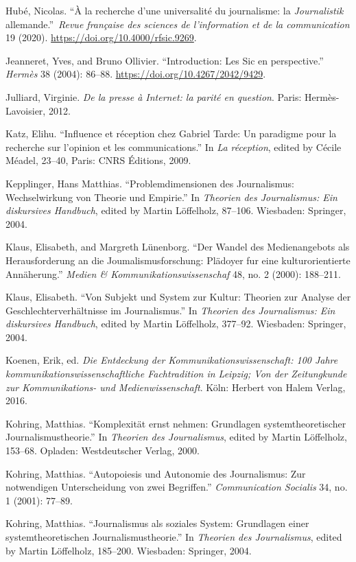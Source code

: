 \documentclass{tufte-handout}
\begin{document}
\begin{hangparas}{.25in}{1}
Hubé, Nicolas. ``À la recherche d'une universalité du journalisme: la
\emph{Journalistik} allemande.''~\emph{Revue française des sciences de
l'information et de la communication} 19 (2020).
\url{https://doi.org/10.4000/rfsic.9269}.

Jeanneret, Yves, and Bruno Ollivier. ``Introduction: Les Sic en
perspective.'' \emph{Hermès} 38 (2004): 86--88.
\url{https://doi.org/10.4267/2042/9429}.

Julliard, Virginie. \emph{De la presse à Internet: la parité en
question}. Paris: Hermès-Lavoisier, 2012.

Katz, Elihu. ``Influence et réception chez Gabriel Tarde: Un paradigme
pour la recherche sur l'opinion et les communications.'' In \emph{La
réception}, edited by Cécile Méadel, 23--40, Paris: CNRS Éditions, 2009.

Kepplinger, Hans Matthias. ``Problemdimensionen des Journalismus:
Wechselwirkung von Theorie und Empirie.'' In \emph{Theorien des
Journalismus: Ein diskursives Handbuch}, edited by Martin Löffelholz,
87--106. Wiesbaden: Springer, 2004.

Klaus, Elisabeth, and Margreth Lünenborg. ``Der Wandel des
Medienangebots als Herausforderung an die Joumalismusforschung: Plädoyer
fur eine kulturorientierte Annäherung.'' \emph{Medien \&
Kommunikationswissenschaf} 48, no. 2 (2000): 188--211.

Klaus, Elisabeth. ``Von Subjekt und System zur Kultur: Theorien zur
Analyse der Geschlechterverhältnisse im Journalismus.'' In
\emph{Theorien des Journalismus: Ein diskursives Handbuch}, edited by
Martin Löffelholz, 377--92. Wiesbaden: Springer, 2004.

Koenen, Erik, ed. \emph{Die Entdeckung der Kommunikationswissenschaft:
100 Jahre kommunikationswissenschaftliche Fachtradition in Leipzig; Von
der Zeitungkunde zur Kommunikations- und Medienwissenschaft}. Köln:
Herbert von Halem Verlag, 2016.

Kohring, Matthias. ``Komplexität ernst nehmen: Grundlagen
systemtheoretischer Journalismustheorie.'' In \emph{Theorien des
Journalismus}, edited by Martin Löffelholz, 153--68. Opladen:
Westdeutscher Verlag, 2000.

Kohring, Matthias. ``Autopoiesis und Autonomie des Journalismus: Zur
notwendigen Unterscheidung von zwei Begriffen.'' \emph{Communication
Socialis} 34, no. 1 (2001): 77--89.

Kohring, Matthias. ``Journalismus als soziales System: Grundlagen einer
systemtheoretischen Journalismustheorie.'' In \emph{Theorien des
Journalismus}, edited by Martin Löffelholz, 185--200. Wiesbaden:
Springer, 2004.


\end{hangparas}
\end{document}
